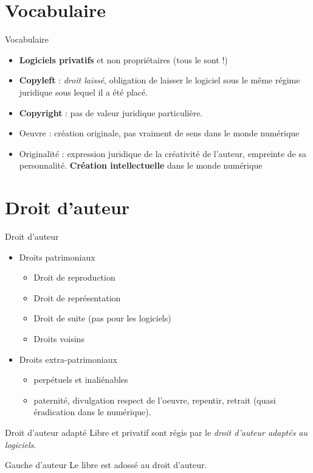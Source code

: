 \documentclass{beamer}
\begin{document}
\section{Vocabulaire}

\begin{frame}{Vocabulaire}

  \begin{itemize}
  \item \textbf{Logiciels privatifs} et non propriétaires (tous le sont !)
  \item \textbf{Copyleft} : \textit{droit laissé}, obligation de laisser le logiciel sous le même régime juridique sous lequel il a été placé.
  \item \textbf{Copyright} : pas de valeur juridique particulière. 
  \item Oeuvre : création originale, pas vraiment de sens dans le monde numérique
  \item Originalité : expression juridique de la créativité de l'auteur, empreinte de sa personnalité. \textbf{Création intellectuelle} dans le monde numérique
  \end{itemize}
\end{frame}

\section{Droit d'auteur}

\begin{frame}{Droit d'auteur}

  \begin{itemize}
  \item Droits patrimoniaux
    \begin{itemize}
    \item Droit de reproduction
    \item Droit de représentation
    \item Droit de suite (pas pour les logiciels)
    \item Droits voisins
    \end{itemize}
  \item Droits extra-patrimoniaux
    \begin{itemize}
    \item perpétuels et inaliénables
    \item paternité, divulgation  respect de l'oeuvre, repentir, retrait (quasi éradication dans le numérique).
    \end{itemize}
  \end{itemize}

 \begin{alertblock}{Droit d'auteur adapté}
    Libre et privatif sont régis par le \textit{droit d'auteur adaptés au logiciels}.
  \end{alertblock}

  \begin{alertblock}{Gauche d'auteur}
    Le libre est adossé au droit d'auteur.
  \end{alertblock}
\end{frame}
\end{document}

